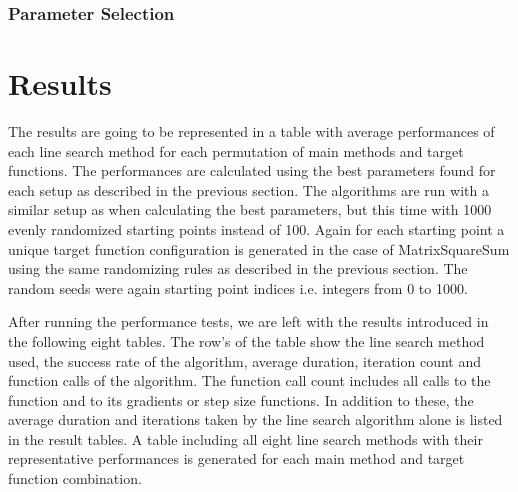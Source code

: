 \documentclass[a4paper,english,titlepage,12pt]{article}
\newcommand{\vect}[1]{\ensuremath{\mathbf{#1}}}
\begin{document}


\subsubsection{Parameter Selection}


\section{Results}

The results are going to be represented in a table with average performances of each line search method for each permutation of main methods and target functions. The performances are calculated using the best parameters found for each setup as described in the previous section. The algorithms are run with a similar setup as when calculating the best parameters, but this time with 1000 evenly randomized starting points instead of 100. Again for each starting point a unique target function configuration is generated in the case of MatrixSquareSum using the same randomizing rules as described in the previous section. The random seeds were again starting point indices i.e. integers from 0 to 1000.

After running the performance tests, we are left with the results introduced in the following eight tables. The row's of the table show the line search method used, the success rate of the algorithm, average duration, iteration count and function calls of the algorithm. The function call count includes all calls to the function and to its gradients or step size functions. In addition to these, the average duration and iterations taken by the line search algorithm alone is listed in the result tables. A table including all eight line search methods with their representative performances is generated for each main method and target function combination.
\end{document}
